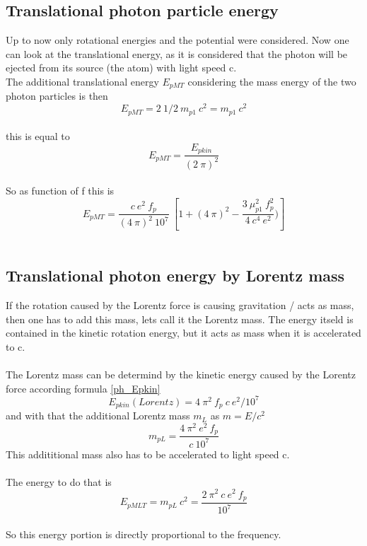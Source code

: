 \documentclass[10pt,titlepage]{article}
\begin{document}


\subsection{Translational photon particle energy}
Up to now only rotational energies and the potential were considered. Now one can look at the translational energy, as it is considered that the photon will be ejected from its source (the atom) with light speed c.\\
The additional translational energy $E_{pMT}$ considering the mass energy of the two photon particles is then
\begin{equation}
 E_{pMT} = 2 \ 1/2 \ m_{p1} \ c^2= m_{p1} \ c^2
\end{equation}\\
this is equal to
\begin{equation}
E_{pMT} = \frac{E_{pkin}}{(2 \ \pi)^2 }
\end{equation}\\
So as function of f this is
\begin{equation}
E_{pMT} = \frac{c \ e^2 \ f_p}{(4 \ \pi )^2 \ 10^7} \ \left[  1 + (4 \ \pi)^2-\frac{3 \ \mu_{p1}^2 \ f_p^2}{4 \ c^4 \ e^2})\right]
\end{equation}\\


\subsection{Translational photon energy by Lorentz mass}
If the rotation caused by the Lorentz force is causing gravitation / acts as mass, then one has to add this mass, lets call it the Lorentz mass. The energy itseld is contained in the kinetic rotation energy, but it acts as mass when it is accelerated to c.
\\\\
The Lorentz mass can be determind by the kinetic energy caused by the Lorentz force according formula \eqref{ph_Epkin}
\begin{equation}
E_{pkin}(Lorentz)=4 \ \pi^2 \ f_p \ c \ e^2/10^7
\end{equation}
and with that the additional Lorentz mass $m_L$ as  $m=E/c^2$
\begin{equation}
m_{pL}= \frac{4 \ \pi^2 \ e^2 \ f_p}{c \ 10^7}
\end{equation}
This addititional mass also has to be accelerated to light speed c.
\\\\
The energy to do that is
\begin{equation}
E_{pMLT}=m_{pL} \ c^2= \frac{2 \ \pi^2 \ c \ e^2 \ f_p}{10^7}
\end{equation}
\\
So this energy portion is directly proportional to the frequency.
\end{document}
